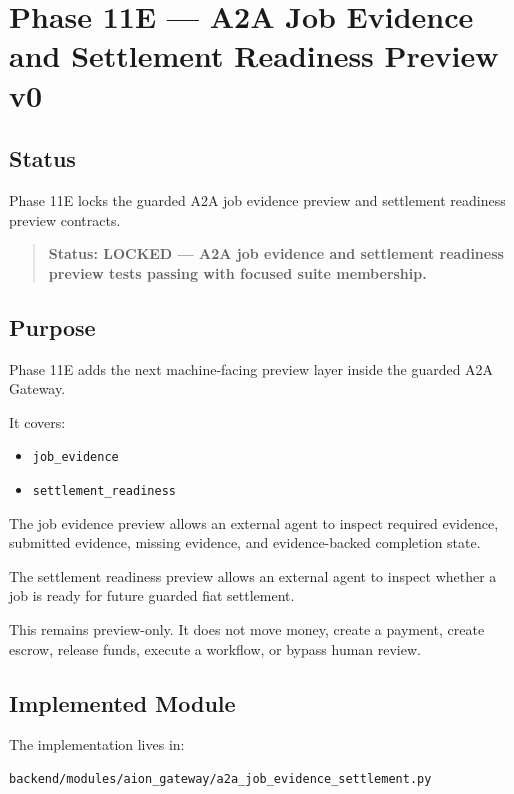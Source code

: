 \section{Phase 11E --- A2A Job Evidence and Settlement Readiness Preview v0}
\label{sec:aion-a2a-job-evidence-settlement-preview-v0}

\subsection{Status}

Phase 11E locks the guarded A2A job evidence preview and settlement readiness preview contracts.

\begin{quote}
\textbf{Status: LOCKED --- A2A job evidence and settlement readiness preview tests passing with focused suite membership.}
\end{quote}

\subsection{Purpose}

Phase 11E adds the next machine-facing preview layer inside the guarded A2A Gateway.

It covers:

\begin{itemize}
  \item \texttt{job\_evidence}
  \item \texttt{settlement\_readiness}
\end{itemize}

The job evidence preview allows an external agent to inspect required evidence, submitted evidence, missing evidence, and evidence-backed completion state.

The settlement readiness preview allows an external agent to inspect whether a job is ready for future guarded fiat settlement.

This remains preview-only. It does not move money, create a payment, create escrow, release funds, execute a workflow, or bypass human review.

\subsection{Implemented Module}

The implementation lives in:

\begin{verbatim}
backend/modules/aion_gateway/a2a_job_evidence_settlement.py
\end{verbatim}

